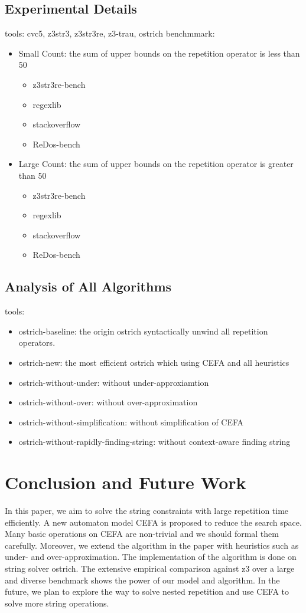 \documentclass[runningheads]{llncs}
\begin{document}
\subsection{Experimental Details}
tools: cvc5, z3str3, z3str3re, z3-trau, ostrich
benchmmark:
\begin{itemize}
  \item Small Count: the sum of upper bounds on the repetition operator is less than 50
  \begin{itemize}
    \item z3str3re-bench
    \item regexlib
    \item stackoverflow
    \item ReDos-bench
  \end{itemize}
  \item Large Count: the sum of upper bounds on the repetition operator is greater than 50
  \begin{itemize}
    \item z3str3re-bench
    \item regexlib
    \item stackoverflow
    \item ReDos-bench
  \end{itemize}
\end{itemize}


\subsection{Analysis of All Algorithms}
tools:
\begin{itemize}
  \item ostrich-baseline: the origin ostrich syntactically unwind all repetition operators.
  \item ostrich-new: the most efficient ostrich which using CEFA and all heuristics
  \item ostrich-without-under: without under-approxiamtion
  \item ostrich-without-over: without over-approximation
  \item ostrich-without-simplification: without simplification of CEFA
  \item ostrich-without-rapidly-finding-string: without context-aware finding string
\end{itemize}


\section{Conclusion and Future Work} \label{sec:conclu}
In this paper, we aim to solve the string constraints with large repetition time efficiently. A new automaton model CEFA is proposed to reduce the search space. Many basic operations on CEFA are non-trivial and we should formal them carefully. Moreover, we extend the algorithm in the paper \cite{atva2020} with heuristics such as under- and over-approximation. The implementation of the algorithm is done on string solver ostrich. The extensive empirical comparison against z3 over a large and diverse benchmark shows the power of our model and algorithm. In the future, we plan to explore the way to solve nested repetition and use CEFA to solve more string operations.



\end{document}
